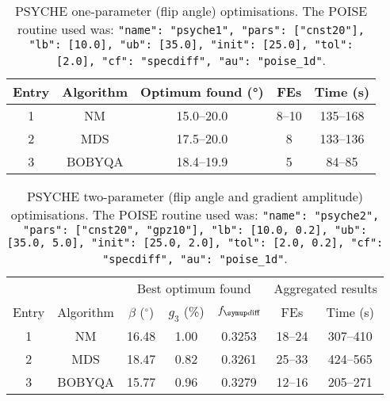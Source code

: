 \begin{table}
    \centering
    \begin{tabular}{ccccc}
        \toprule
       Entry & Algorithm & Optimum found (\unit{\degree}) & FEs   & Time (\unit{\s}) \\
        \midrule
        1     & NM        & 15.0--20.0                   & 8--10 & 135--168             \\
        2     & MDS       & 17.5--20.0                   & 8     & 133--136             \\
        3     & BOBYQA    & 18.4--19.9                   & 5     & 84--85               \\
        \bottomrule
    \end{tabular}
    \caption[PSYCHE one-parameter optimisations]{
        PSYCHE one-parameter (flip angle) optimisations.
        The POISE routine used was: \texttt{{"name": "psyche1", "pars": ["cnst20"], "lb": [10.0], "ub": [35.0], "init": [25.0], "tol": [2.0], "cf": "specdiff", "au": "poise_1d"}}.
    }
    \label{tbl:poise_psyche1p}
\end{table}

\begin{table}
    \centering
    \begin{tabular}{ccccccc}
        \toprule
              &           & \multicolumn{3}{c}{Best optimum found}            & \multicolumn{2}{c}{Aggregated results} \\
                            \cmidrule(lr){3-5}                                  \cmidrule(lr){6-7}
        Entry & Algorithm & $\beta$ ($^\circ$) & $g_3$ (\%) & $\fdiff$ & FEs    & Time (\unit{\s}) \\
        \midrule
        1     & NM        & 16.48              & 1.00       & 0.3253          & 18--24 & 307--410             \\
        2     & MDS       & 18.47              & 0.82       & 0.3261          & 25--33 & 424--565             \\
        3     & BOBYQA    & 15.77              & 0.96       & 0.3279          & 12--16 & 205--271             \\
        \bottomrule
    \end{tabular}
    \caption[PSYCHE two-parameter optimisations]{
        PSYCHE two-parameter (flip angle and gradient amplitude) optimisations.
        The POISE routine used was: \texttt{{"name": "psyche2", "pars": ["cnst20", "gpz10"], "lb": [10.0, 0.2], "ub": [35.0, 5.0], "init": [25.0, 2.0], "tol": [2.0, 0.2], "cf": "specdiff", "au": "poise_1d"}}.
    }
    \label{tbl:poise_psyche2p}
\end{table}

